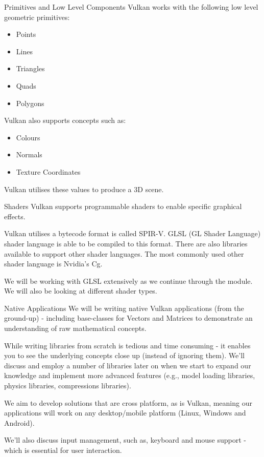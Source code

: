 \documentclass[handout,18pt]{beamer}
\begin{document}
\begin{frame}{Primitives and Low Level Components}
\pause
Vulkan works with the following low level geometric primitives:
\begin{itemize}
\item Points
\item Lines
\item Triangles
\item Quads
\item Polygons
\end{itemize}
\pause

\vspace{11pt}
Vulkan also supports concepts such as:
\begin{itemize}
\item Colours
\item Normals
\item Texture Coordinates
\end{itemize}
\pause

\vspace{11pt}
Vulkan utilises these values to produce a 3D scene.
\end{frame}

\begin{frame}{Shaders}
\pause
Vulkan supports programmable shaders to enable specific graphical 
effects.
\pause

\vspace{11pt}
Vulkan utilises a bytecode format is called SPIR-V.
GLSL (GL Shader Language) shader language is able to be compiled to this format.
There are also libraries available to support other shader languages.  
The most commonly used other shader language is Nvidia's Cg.
\pause

\vspace{11pt}
We will be working with GLSL extensively as we continue through the 
module.  We will also be looking at different shader types.
\end{frame}

\begin{frame}{Native Applications}
\pause
We will be writing native Vulkan applications (from the ground-up) - including base-classes for Vectors and Matrices to demonstrate an understanding of raw mathematical concepts.
\pause

\vspace{11pt}
While writing libraries from scratch is tedious and time consuming - it enables you to see the underlying concepts close up (instead of ignoring them).
We'll discuss and employ a number of libraries later on when we start to expand our knowledge and implement more advanced features (e.g., model loading libraries, physics libraries, compressions libraries).

\pause

\vspace{11pt}
We aim to develop solutions that are cross platform, as is Vulkan, meaning our applications will work on any desktop/mobile platform (Linux, Windows and Android).
\pause

\vspace{11pt}
We'll also discuss input management, such as, keyboard and mouse support - which is essential for user interaction.
\end{frame}
\end{document}
